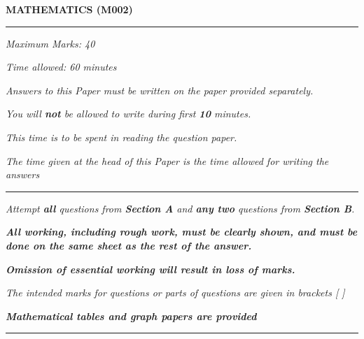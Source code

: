 \begin{center}
   \Large
   \textbf{MATHEMATICS (M002)}
   \rule{\textwidth}{0.4pt}
   \normalsize
   \textit{Maximum Marks: 40}

   \textit{Time allowed: 60 minutes}

   \textit{Answers to this Paper must be written on the paper provided separately.}

   \textit{You will \textbf{not} be allowed to write during first \textbf{10} minutes.}

   \textit{This time is to be spent in reading the question paper.}

   \textit{The time given at the head of this Paper is the time allowed for writing the answers}
   \rule{\textwidth}{0.4pt}
   \small

   \textit{Attempt \textbf{all} questions from \textbf{Section A} and \textbf{any two} questions from \textbf{Section B}.}

   \textit{\textbf{All working, including rough work, must be clearly shown, and must be done on the same sheet as the rest of the answer.}}

   \textit{\textbf{Omission of essential working will result in loss of marks.}}

   \textit{The intended marks for questions or parts of questions are given in brackets [ ]}

   \textit{\textbf{Mathematical tables and graph papers are provided}}
   \rule{\textwidth}{0.4pt}
\end{center}
